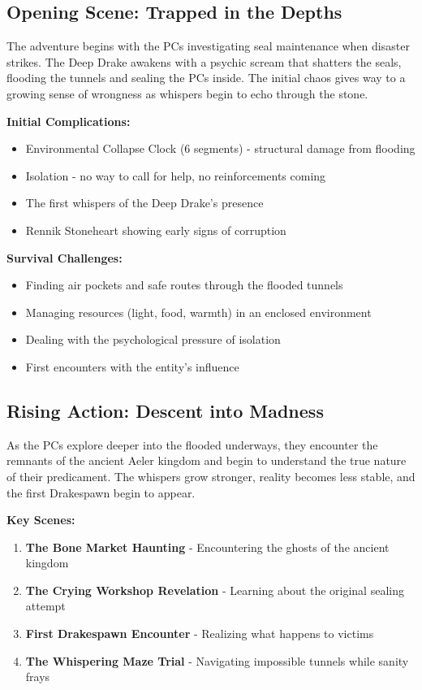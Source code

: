 \documentclass[11pt]{article}
\begin{document}
\subsection{Opening Scene: Trapped in the Depths}

The adventure begins with the PCs investigating seal maintenance when disaster strikes. The Deep Drake awakens with a psychic scream that shatters the seals, flooding the tunnels and sealing the PCs inside. The initial chaos gives way to a growing sense of wrongness as whispers begin to echo through the stone.

\textbf{Initial Complications:}
\begin{itemize}
\item Environmental Collapse Clock (6 segments) - structural damage from flooding
\item Isolation - no way to call for help, no reinforcements coming
\item The first whispers of the Deep Drake's presence
\item Rennik Stoneheart showing early signs of corruption
\end{itemize}

\textbf{Survival Challenges:}
\begin{itemize}
\item Finding air pockets and safe routes through the flooded tunnels
\item Managing resources (light, food, warmth) in an enclosed environment
\item Dealing with the psychological pressure of isolation
\item First encounters with the entity's influence
\end{itemize}

\subsection{Rising Action: Descent into Madness}

As the PCs explore deeper into the flooded underways, they encounter the remnants of the ancient Aeler kingdom and begin to understand the true nature of their predicament. The whispers grow stronger, reality becomes less stable, and the first Drakespawn begin to appear.

\textbf{Key Scenes:}
\begin{enumerate}
\item \textbf{The Bone Market Haunting} - Encountering the ghosts of the ancient kingdom
\item \textbf{The Crying Workshop Revelation} - Learning about the original sealing attempt
\item \textbf{First Drakespawn Encounter} - Realizing what happens to victims
\item \textbf{The Whispering Maze Trial} - Navigating impossible tunnels while sanity frays
\end{enumerate}
\end{document}
